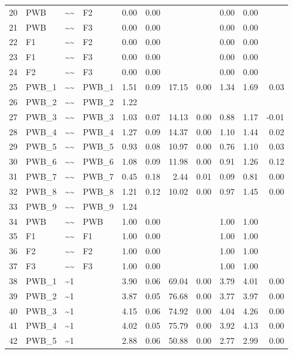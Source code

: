 \documentclass{article}
\begin{document}
\begin{table}[ht]
\begin{tabular}{rlllrrrrrrr}
  20 & PWB & \~{}\~{} & F2 & 0.00 & 0.00 &  &  & 0.00 & 0.00 &  \\ 
  21 & PWB & \~{}\~{} & F3 & 0.00 & 0.00 &  &  & 0.00 & 0.00 &  \\ 
  22 & F1 & \~{}\~{} & F2 & 0.00 & 0.00 &  &  & 0.00 & 0.00 &  \\ 
  23 & F1 & \~{}\~{} & F3 & 0.00 & 0.00 &  &  & 0.00 & 0.00 &  \\ 
  24 & F2 & \~{}\~{} & F3 & 0.00 & 0.00 &  &  & 0.00 & 0.00 &  \\ 
  25 & PWB\_1 & \~{}\~{} & PWB\_1 & 1.51 & 0.09 & 17.15 & 0.00 & 1.34 & 1.69 & 0.03 \\ 
  26 & PWB\_2 & \~{}\~{} & PWB\_2 & 1.22 &  &  &  &  &  &  \\ 
  27 & PWB\_3 & \~{}\~{} & PWB\_3 & 1.03 & 0.07 & 14.13 & 0.00 & 0.88 & 1.17 & -0.01 \\ 
  28 & PWB\_4 & \~{}\~{} & PWB\_4 & 1.27 & 0.09 & 14.37 & 0.00 & 1.10 & 1.44 & 0.02 \\ 
  29 & PWB\_5 & \~{}\~{} & PWB\_5 & 0.93 & 0.08 & 10.97 & 0.00 & 0.76 & 1.10 & 0.03 \\ 
  30 & PWB\_6 & \~{}\~{} & PWB\_6 & 1.08 & 0.09 & 11.98 & 0.00 & 0.91 & 1.26 & 0.12 \\ 
  31 & PWB\_7 & \~{}\~{} & PWB\_7 & 0.45 & 0.18 & 2.44 & 0.01 & 0.09 & 0.81 & 0.00 \\ 
  32 & PWB\_8 & \~{}\~{} & PWB\_8 & 1.21 & 0.12 & 10.02 & 0.00 & 0.97 & 1.45 & 0.00 \\ 
  33 & PWB\_9 & \~{}\~{} & PWB\_9 & 1.24 &  &  &  &  &  &  \\ 
  34 & PWB & \~{}\~{} & PWB & 1.00 & 0.00 &  &  & 1.00 & 1.00 &  \\ 
  35 & F1 & \~{}\~{} & F1 & 1.00 & 0.00 &  &  & 1.00 & 1.00 &  \\ 
  36 & F2 & \~{}\~{} & F2 & 1.00 & 0.00 &  &  & 1.00 & 1.00 &  \\ 
  37 & F3 & \~{}\~{} & F3 & 1.00 & 0.00 &  &  & 1.00 & 1.00 &  \\ 
  38 & PWB\_1 & \~{}1 &  & 3.90 & 0.06 & 69.04 & 0.00 & 3.79 & 4.01 & 0.00 \\ 
  39 & PWB\_2 & \~{}1 &  & 3.87 & 0.05 & 76.68 & 0.00 & 3.77 & 3.97 & 0.00 \\ 
  40 & PWB\_3 & \~{}1 &  & 4.15 & 0.06 & 74.92 & 0.00 & 4.04 & 4.26 & 0.00 \\ 
  41 & PWB\_4 & \~{}1 &  & 4.02 & 0.05 & 75.79 & 0.00 & 3.92 & 4.13 & 0.00 \\ 
  42 & PWB\_5 & \~{}1 &  & 2.88 & 0.06 & 50.88 & 0.00 & 2.77 & 2.99 & 0.00 \\ 

\end{tabular}
\end{table}
\end{document}
